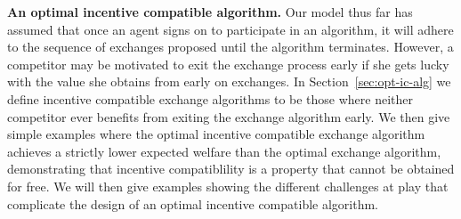     




\textbf{An optimal incentive compatible algorithm.}
Our model thus far has assumed that once an agent signs on to participate in an algorithm, it will 
adhere to the sequence of exchanges proposed until the algorithm terminates. 
However, a competitor may be motivated to exit the exchange process early if she gets lucky with the value
she obtains from early on exchanges. In Section~\ref{sec:opt-ic-alg} we define incentive compatible
exchange algorithms to be those where neither competitor ever benefits from exiting the 
exchange algorithm early. We then give simple examples where the optimal incentive compatible exchange algorithm 
achieves a strictly lower expected welfare than the optimal exchange algorithm, demonstrating that 
incentive compatiblility is a property that cannot be obtained for free. We will then give examples showing the 
different challenges at play that complicate the design of an optimal incentive compatible algorithm. 

